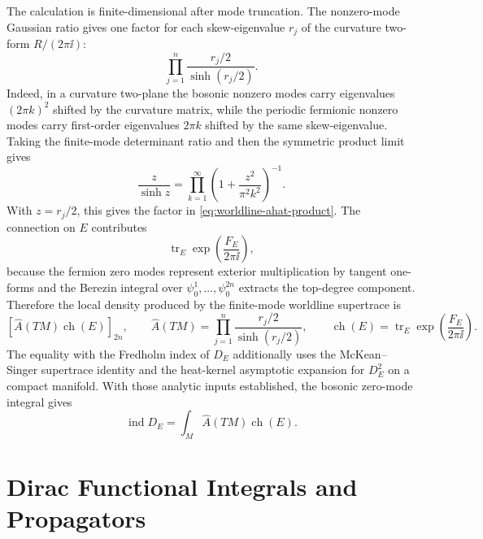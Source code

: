 The calculation is finite-dimensional after mode truncation.  The nonzero-mode
Gaussian ratio gives one factor
for each skew-eigenvalue
\(r_j\) of the curvature two-form \(R/(2\pi\ii)\):
\begin{equation}
  \prod_{j=1}^n
  \frac{r_j/2}{\sinh(r_j/2)}.
  \label{eq:worldline-ahat-product}
\end{equation}
Indeed, in a curvature two-plane the bosonic nonzero modes carry eigenvalues
\((2\pi k)^2\) shifted by the curvature matrix, while the periodic fermionic
nonzero modes carry first-order eigenvalues \(2\pi k\) shifted by the same
skew-eigenvalue.  Taking the finite-mode determinant ratio and then the
symmetric product limit gives
\[
  \frac{z}{\sinh z}
  =
  \prod_{k=1}^\infty
  \left(1+\frac{z^2}{\pi^2k^2}\right)^{-1}.
\]
With \(z=r_j/2\), this gives the factor in
\eqref{eq:worldline-ahat-product}.  The connection on \(E\) contributes
\[
  \operatorname{tr}_E\exp\!\left(\frac{F_E}{2\pi\ii}\right),
\]
because the fermion zero modes represent exterior multiplication by tangent
one-forms and the Berezin integral over
\(\psi_0^1,\ldots,\psi_0^{2n}\) extracts the top-degree component.  Therefore
the local density produced by the finite-mode worldline supertrace is
\begin{equation}
  \left[
    \widehat A(TM)\operatorname{ch}(E)
  \right]_{2n},
  \qquad
  \widehat A(TM)=
  \prod_{j=1}^n\frac{r_j/2}{\sinh(r_j/2)},
  \qquad
  \operatorname{ch}(E)=
  \operatorname{tr}_E\exp\!\left(\frac{F_E}{2\pi\ii}\right).
  \label{eq:worldline-index-density}
\end{equation}
The equality with the Fredholm index of \(D_E\) additionally uses the
McKean--Singer supertrace identity and the heat-kernel asymptotic expansion for
\(D_E^2\) on a compact manifold.  With those analytic inputs established, the
bosonic zero-mode integral gives
\[
  \operatorname{ind}D_E
  =
  \int_M\widehat A(TM)\operatorname{ch}(E).
\]

\section{Dirac Functional Integrals and Propagators}

